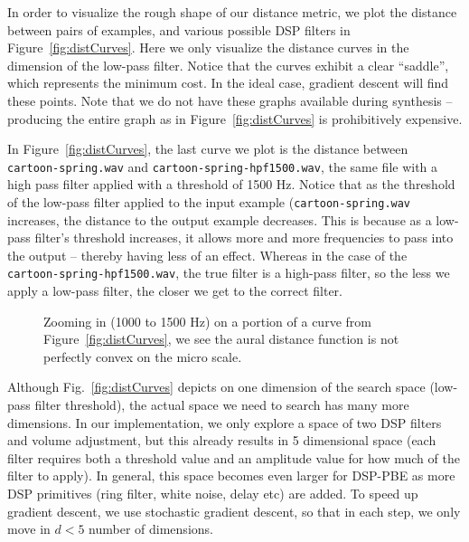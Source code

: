 In order to visualize the rough shape of our distance metric, we plot the distance between pairs of examples, and various possible DSP filters in Figure~\ref{fig:distCurves}.
Here we only visualize the distance curves in the dimension of the low-pass filter.
Notice that the curves exhibit a clear ``saddle'', which represents the minimum cost.
In the ideal case, gradient descent will find these points.
Note that we do not have these graphs available during synthesis -- producing the entire graph as in Figure~\ref{fig:distCurves} is prohibitively expensive.

In Figure~\ref{fig:distCurves}, the last curve we plot is the distance between \texttt{cartoon-spring.wav} and \texttt{cartoon-spring-hpf1500.wav}, the same file with a high pass filter applied with a threshold of 1500 Hz.
Notice that as the threshold of the low-pass filter applied to the input example (\texttt{cartoon-spring.wav} increases, the distance to the output example decreases. 
This is because as a low-pass filter's threshold increases, it allows more and more frequencies to pass into the output -- thereby having less of an effect.
Whereas in the case of the \texttt{cartoon-spring-hpf1500.wav}, the true filter is a high-pass filter, so the less we apply a low-pass filter, the closer we get to the correct filter.

\begin{figure}

\caption{Zooming in (1000 to 1500 Hz) on a portion of a curve from Figure~\ref{fig:distCurves}, we see the aural distance function is not perfectly convex on the micro scale.}
\label{fig:microDist}
\end{figure}

Although Fig.~\ref{fig:distCurves} depicts on one dimension of the search space (low-pass filter threshold), the actual space we need to search has many more dimensions.
In our implementation, we only explore a space of two DSP filters and volume adjustment, but this already results in 5 dimensional space (each filter requires both a threshold value and an amplitude value for how much of the filter to apply).
In general, this space becomes even larger for DSP-PBE as more DSP primitives (ring filter, white noise, delay etc) are added.
To speed up gradient descent, we use stochastic gradient descent, so that in each step, we only move in $d<5$ number of dimensions.

